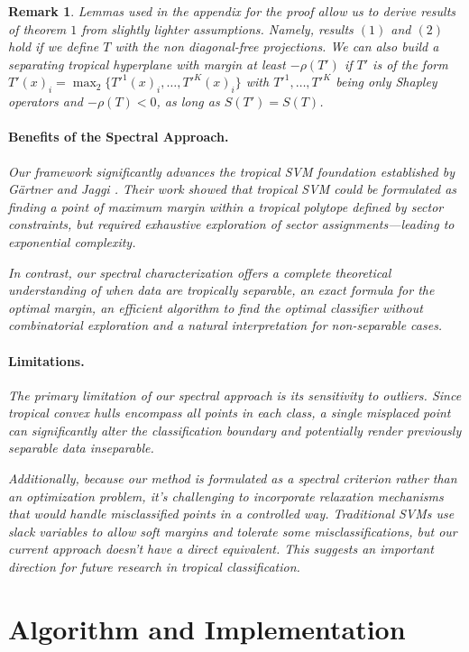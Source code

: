 \documentclass{article}
\newtheorem{remark}{Remark}
\begin{document}
\begin{remark} Lemmas used in the appendix for the proof allow us to derive results of theorem $1$ from slightly lighter assumptions. Namely, results $(1)$ and $(2)$ hold if we define $T$ with the non diagonal-free projections. We can also build a separating tropical hyperplane with margin at least $-\rho(T')$ if $T'$ is of the form  $T'(x)_i = \operatorname{\max}_2\{T'^1(x)_i, \dots, T'^K(x)_i\}$ with $T'^1, \ldots, T'^K$ being only Shapley operators and $-\rho(T)<0$, as long as $S(T') = S(T)$.



\paragraph{Benefits of the Spectral Approach.} 
Our framework significantly advances the tropical SVM foundation established by Gärtner and Jaggi \cite{gartner2008}. Their work showed that tropical SVM could be formulated as finding a point of maximum margin within a tropical polytope defined by sector constraints, but required exhaustive exploration of sector assignments—leading to exponential complexity.

In contrast, our spectral characterization offers a complete theoretical understanding of when data are tropically separable, an exact formula for the optimal margin, an efficient algorithm to find the optimal classifier without combinatorial exploration and a natural interpretation for non-separable cases.

\paragraph{Limitations.} 
The primary limitation of our spectral approach is its sensitivity to outliers. Since tropical convex hulls encompass all points in each class, a single misplaced point can significantly alter the classification boundary and potentially render previously separable data inseparable.

Additionally, because our method is formulated as a spectral criterion rather than an optimization problem, it's challenging to incorporate relaxation mechanisms that would handle misclassified points in a controlled way. Traditional SVMs use slack variables to allow soft margins and tolerate some misclassifications, but our current approach doesn't have a direct equivalent. This suggests an important direction for future research in tropical classification.

\section{Algorithm and Implementation}\label{sec:algorithm}


\end{remark}
\end{document}
